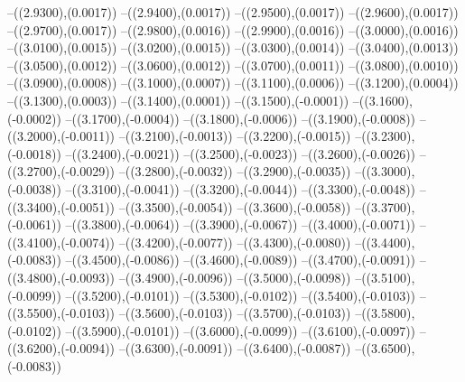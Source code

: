 {	--({\sx*(2.9300)},{\sy*(0.0017)})
	--({\sx*(2.9400)},{\sy*(0.0017)})
	--({\sx*(2.9500)},{\sy*(0.0017)})
	--({\sx*(2.9600)},{\sy*(0.0017)})
	--({\sx*(2.9700)},{\sy*(0.0017)})
	--({\sx*(2.9800)},{\sy*(0.0016)})
	--({\sx*(2.9900)},{\sy*(0.0016)})
	--({\sx*(3.0000)},{\sy*(0.0016)})
	--({\sx*(3.0100)},{\sy*(0.0015)})
	--({\sx*(3.0200)},{\sy*(0.0015)})
	--({\sx*(3.0300)},{\sy*(0.0014)})
	--({\sx*(3.0400)},{\sy*(0.0013)})
	--({\sx*(3.0500)},{\sy*(0.0012)})
	--({\sx*(3.0600)},{\sy*(0.0012)})
	--({\sx*(3.0700)},{\sy*(0.0011)})
	--({\sx*(3.0800)},{\sy*(0.0010)})
	--({\sx*(3.0900)},{\sy*(0.0008)})
	--({\sx*(3.1000)},{\sy*(0.0007)})
	--({\sx*(3.1100)},{\sy*(0.0006)})
	--({\sx*(3.1200)},{\sy*(0.0004)})
	--({\sx*(3.1300)},{\sy*(0.0003)})
	--({\sx*(3.1400)},{\sy*(0.0001)})
	--({\sx*(3.1500)},{\sy*(-0.0001)})
	--({\sx*(3.1600)},{\sy*(-0.0002)})
	--({\sx*(3.1700)},{\sy*(-0.0004)})
	--({\sx*(3.1800)},{\sy*(-0.0006)})
	--({\sx*(3.1900)},{\sy*(-0.0008)})
	--({\sx*(3.2000)},{\sy*(-0.0011)})
	--({\sx*(3.2100)},{\sy*(-0.0013)})
	--({\sx*(3.2200)},{\sy*(-0.0015)})
	--({\sx*(3.2300)},{\sy*(-0.0018)})
	--({\sx*(3.2400)},{\sy*(-0.0021)})
	--({\sx*(3.2500)},{\sy*(-0.0023)})
	--({\sx*(3.2600)},{\sy*(-0.0026)})
	--({\sx*(3.2700)},{\sy*(-0.0029)})
	--({\sx*(3.2800)},{\sy*(-0.0032)})
	--({\sx*(3.2900)},{\sy*(-0.0035)})
	--({\sx*(3.3000)},{\sy*(-0.0038)})
	--({\sx*(3.3100)},{\sy*(-0.0041)})
	--({\sx*(3.3200)},{\sy*(-0.0044)})
	--({\sx*(3.3300)},{\sy*(-0.0048)})
	--({\sx*(3.3400)},{\sy*(-0.0051)})
	--({\sx*(3.3500)},{\sy*(-0.0054)})
	--({\sx*(3.3600)},{\sy*(-0.0058)})
	--({\sx*(3.3700)},{\sy*(-0.0061)})
	--({\sx*(3.3800)},{\sy*(-0.0064)})
	--({\sx*(3.3900)},{\sy*(-0.0067)})
	--({\sx*(3.4000)},{\sy*(-0.0071)})
	--({\sx*(3.4100)},{\sy*(-0.0074)})
	--({\sx*(3.4200)},{\sy*(-0.0077)})
	--({\sx*(3.4300)},{\sy*(-0.0080)})
	--({\sx*(3.4400)},{\sy*(-0.0083)})
	--({\sx*(3.4500)},{\sy*(-0.0086)})
	--({\sx*(3.4600)},{\sy*(-0.0089)})
	--({\sx*(3.4700)},{\sy*(-0.0091)})
	--({\sx*(3.4800)},{\sy*(-0.0093)})
	--({\sx*(3.4900)},{\sy*(-0.0096)})
	--({\sx*(3.5000)},{\sy*(-0.0098)})
	--({\sx*(3.5100)},{\sy*(-0.0099)})
	--({\sx*(3.5200)},{\sy*(-0.0101)})
	--({\sx*(3.5300)},{\sy*(-0.0102)})
	--({\sx*(3.5400)},{\sy*(-0.0103)})
	--({\sx*(3.5500)},{\sy*(-0.0103)})
	--({\sx*(3.5600)},{\sy*(-0.0103)})
	--({\sx*(3.5700)},{\sy*(-0.0103)})
	--({\sx*(3.5800)},{\sy*(-0.0102)})
	--({\sx*(3.5900)},{\sy*(-0.0101)})
	--({\sx*(3.6000)},{\sy*(-0.0099)})
	--({\sx*(3.6100)},{\sy*(-0.0097)})
	--({\sx*(3.6200)},{\sy*(-0.0094)})
	--({\sx*(3.6300)},{\sy*(-0.0091)})
	--({\sx*(3.6400)},{\sy*(-0.0087)})
	--({\sx*(3.6500)},{\sy*(-0.0083)})
}
